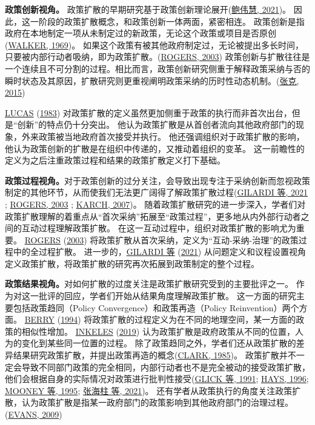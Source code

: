 \documentclass[
  12pt,
]{ctexart}
\begin{document}
\textbf{政策创新视角。}
政策扩散的早期研究基于政策创新理论展开(\protect\hyperlink{ref-BaoWeiHui2021}{鲍伟慧, 2021})。
因此，这一阶段的政策扩散概念，和政策创新一体两面，紧密相连。
政策创新是指政府在本地制定一项从未制定过的新政策，无论这个政策或项目是否原创(\protect\hyperlink{ref-Walker1969}{WALKER, 1969})。
如果这个政策有被其他政府制定过，无论被提出多长时间，只要被内部行动者吸纳，即为政策扩散。(\protect\hyperlink{ref-Rogers2003}{ROGERS, 2003})
政策创新与扩散往往是一个连续且不可分割的过程。相比而言，政策创新研究侧重于解释政策采纳与否的瞬时状态及其原因，扩散研究则更重视阐明政策采纳的历时性动态机制。(\protect\hyperlink{ref-ZhangKe2015}{张克, 2015})

\protect\hyperlink{ref-Lucas1983}{LUCAS} (\protect\hyperlink{ref-Lucas1983}{1983}) 对政策扩散的定义虽然更加侧重于政策的执行而非首次出台，但是``创新''的特点仍十分突出。
他认为政策扩散是从首创者流向其他政府部门的现象，外来政策被当地政府首次接受并执行。
他还强调组织对于政策扩散的影响，他认为政策创新的扩散是在组织中传递的，又推动着组织的变革。
这一前瞻性的定义为之后注重政策过程和结果的政策扩散定义打下基础。

\textbf{政策过程视角。}对于政策创新的过分关注，会导致出现专注于采纳创新而忽视政策制定的其他环节，从而使我们无法更广阔得了解政策扩散过程(\protect\hyperlink{ref-GilardiEtAl2021}{GILARDI 等, 2021} ; \protect\hyperlink{ref-Rogers2003}{ROGERS, 2003} ; \protect\hyperlink{ref-Karch2007}{KARCH, 2007})。
随着政策扩散研究的进一步深入，学者们对政策扩散理解的着重点从``首次采纳''拓展至``政策过程''，更多地从内外部行动者之间的互动过程理解政策扩散。
在这一互动过程中，组织对政策扩散的影响尤为重要。
\protect\hyperlink{ref-Rogers2003}{ROGERS} (\protect\hyperlink{ref-Rogers2003}{2003}) 将政策扩散从首次采纳，定义为``互动-采纳-治理''的政策过程中的全过程扩散。
进一步的，\protect\hyperlink{ref-GilardiEtAl2021}{GILARDI 等} (\protect\hyperlink{ref-GilardiEtAl2021}{2021}) 从问题定义和议程设置视角定义政策扩散，将政策扩散的研究再次拓展到政策制定的整个过程。

\textbf{政策结果视角。}对如何扩散的过度关注是政策扩散研究受到的主要批评之一。
作为对这一批评的回应，学者们开始从结果角度理解政策扩散。
这一方面的研究主要包括政策趋同（Policy Convergence）和政策再造（Policy Reinvention）两个方面。
\protect\hyperlink{ref-Berry1994}{BERRY} (\protect\hyperlink{ref-Berry1994}{1994}) 将政策扩散的过程定义为在不同的地理空间，某一方面的政策的相似性增加。
\protect\hyperlink{ref-Inkeles2019}{INKELES} (\protect\hyperlink{ref-Inkeles2019}{2019}) 认为政策扩散是政府政策从不同的位置，人为的变化到某些同一位置的过程。
除了政策趋同之外，学者们还从政策扩散的差异结果研究政策扩散，并提出政策再造的概念(\protect\hyperlink{ref-Clark1985}{CLARK, 1985})。
政策扩散并不一定会导致不同部门政策的完全相同，内部行动者也不是完全被动的接受政策扩散，他们会根据自身的实际情况对政策进行批判性接受(\protect\hyperlink{ref-GlickHays1991}{GLICK 等, 1991}; \protect\hyperlink{ref-Hays1996}{HAYS, 1996}; \protect\hyperlink{ref-MooneyLee1995}{MOONEY 等, 1995}; \protect\hyperlink{ref-ZhangHaiZhuLinHuaJing2021}{张海柱 等, 2021})。
还有学者从政策执行的角度关注政策扩散，认为政策扩散是指某一政府部门的政策影响到其他政府部门的治理过程。(\protect\hyperlink{ref-Evans2009}{EVANS, 2009})
\end{document}

